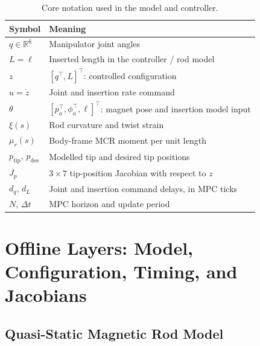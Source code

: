 \documentclass[journal]{IEEEtran}
\begin{document}
\begin{table}[tb]
\centering
\caption{Core notation used in the model and controller.}
\label{tab:notation}
\footnotesize
\setlength{\tabcolsep}{3.5pt}
\renewcommand{\arraystretch}{1.08}
\begin{tabular}{@{}>{\raggedright\arraybackslash}p{}>{\raggedright\arraybackslash}p{}@{}}
\toprule
Symbol & Meaning \\
\midrule
$q\in\mathbb R^6$ & Manipulator joint angles \\
$L=\ell$ & Inserted length in the controller / rod model \\
$z$ & $[q^\top,L]^\top$: controlled configuration \\
$u=\dot z$ & Joint and insertion rate command \\
$\theta$ & $[p_a^\top,\phi_a^\top,\ell]^\top$: magnet pose and insertion model input \\
$\xi(s)$ & Rod curvature and twist strain \\
$\mu_r(s)$ & Body-frame MCR moment per unit length \\
$p_{\mathrm{tip}}$, $p_{\mathrm{des}}$ & Modelled tip and desired tip positions \\
$J_p$ & $3\times7$ tip-position Jacobian with respect to $z$ \\
$d_q$, $d_L$ & Joint and insertion command delays, in MPC ticks \\
$N$, $\Delta t$ & MPC horizon and update period \\
\bottomrule
\end{tabular}
\end{table}

\section{Offline Layers: Model, Configuration, Timing, and Jacobians}
\label{sec:offline}

\subsection{Quasi-Static Magnetic Rod Model}
\label{sec:model}
\end{document}
